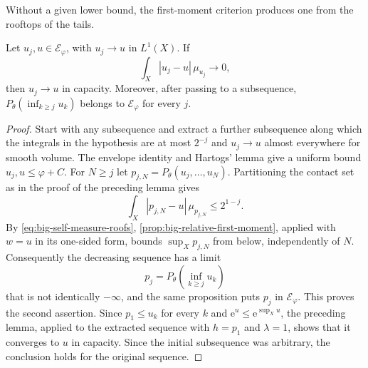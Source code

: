 Without a given lower bound, the first-moment criterion produces one from the rooftops of the tails.

\begin{theorem}\label{thm:big-relative-self-measure-convergence}
Let $u_j,u\in\mathcal E_\varphi$, with $u_j\to u$ in $L^1(X)$. If
\[
 \int_X|u_j-u|\,\mu_{u_j}\longrightarrow0,
\]
then $u_j\to u$ in capacity. Moreover, after passing to a subsequence, $P_\theta(\inf_{k\geq j}u_k)$ belongs to $\mathcal E_\varphi$ for every $j$.
\end{theorem}
\begin{proof}
Start with any subsequence and extract a further subsequence along which the integrals in the hypothesis are at most $2^{-j}$ and $u_j\to u$ almost everywhere for smooth volume. The envelope identity and Hartogs' lemma give a uniform bound $u_j,u\leq\varphi+C$. For $N\geq j$ let $p_{j,N}=P_\theta(u_j,\ldots,u_N)$. Partitioning the contact set as in the proof of the preceding lemma gives
\begin{equation}\label{eq:big-self-measure-roofs}
 \int_X|p_{j,N}-u|\,\mu_{p_{j,N}}\leq2^{1-j}.
\end{equation}
By \eqref{eq:big-self-measure-roofs}, \cref{prop:big-relative-first-moment}, applied with $w=u$ in its one-sided form, bounds $\sup_Xp_{j,N}$ from below, independently of $N$. Consequently the decreasing sequence has a limit
\[
 p_j=P_\theta\left(\inf_{k\geq j}u_k\right)
\]
that is not identically $-\infty$, and the same proposition puts $p_j$ in $\mathcal E_\varphi$. This proves the second assertion. Since $p_1\leq u_k$ for every $k$ and $\mathrm{e}^{u}\leq\mathrm{e}^{\sup_Xu}$, the preceding lemma, applied to the extracted sequence with $h=p_1$ and $\lambda=1$, shows that it converges to $u$ in capacity. Since the initial subsequence was arbitrary, the conclusion holds for the original sequence.
\end{proof}
